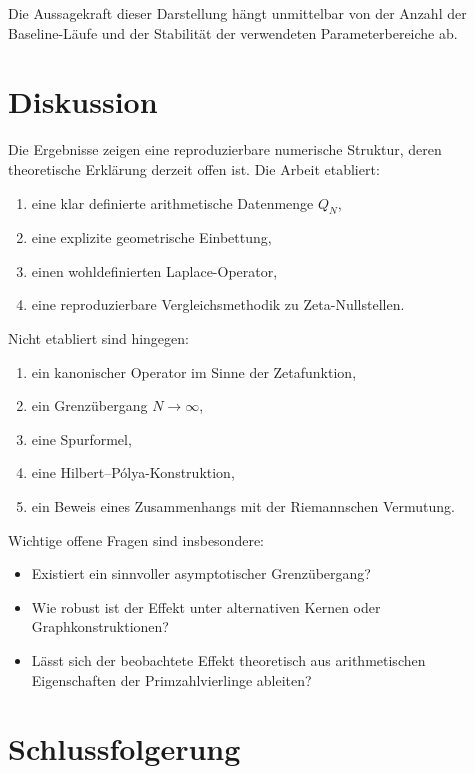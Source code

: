 \documentclass[11pt,a4paper,draft]{article}
\begin{document}
	Die Aussagekraft dieser Darstellung hängt unmittelbar von der Anzahl der Baseline-Läufe und der Stabilität der verwendeten Parameterbereiche ab.
	
	\section{Diskussion}
	
	Die Ergebnisse zeigen eine reproduzierbare numerische Struktur, deren theoretische Erklärung derzeit offen ist. Die Arbeit etabliert:
	\begin{enumerate}[label=(\alph*)]
		\item eine klar definierte arithmetische Datenmenge \(Q_N\),
		\item eine explizite geometrische Einbettung,
		\item einen wohldefinierten Laplace-Operator,
		\item eine reproduzierbare Vergleichsmethodik zu Zeta-Nullstellen.
	\end{enumerate}
	
	Nicht etabliert sind hingegen:
	\begin{enumerate}[label=(\alph*)]
		\item ein kanonischer Operator im Sinne der Zetafunktion,
		\item ein Grenzübergang \(N\to\infty\),
		\item eine Spurformel,
		\item eine Hilbert--Pólya-Konstruktion,
		\item ein Beweis eines Zusammenhangs mit der Riemannschen Vermutung.
	\end{enumerate}
	
	Wichtige offene Fragen sind insbesondere:
	\begin{itemize}
		\item Existiert ein sinnvoller asymptotischer Grenzübergang?
		\item Wie robust ist der Effekt unter alternativen Kernen oder Graphkonstruktionen?
		\item Lässt sich der beobachtete Effekt theoretisch aus arithmetischen Eigenschaften der Primzahlvierlinge ableiten?
	\end{itemize}
	
	\section{Schlussfolgerung}
	
\end{document}
